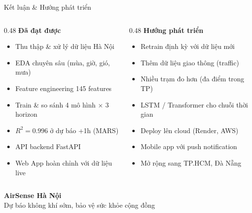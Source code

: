 \documentclass[aspectratio=169]{beamer}
\begin{document}
\begin{frame}{Kết luận \& Hướng phát triển}
  \begin{columns}[T]
    \begin{column}{0.48\textwidth}
      \textbf{Đã đạt được}
      \begin{itemize}
        \item[\checkmark] Thu thập \& xử lý dữ liệu Hà Nội
        \item[\checkmark] EDA chuyên sâu (mùa, giờ, gió, mưa)
        \item[\checkmark] Feature engineering 145 features
        \item[\checkmark] Train \& so sánh 4 mô hình $\times$ 3 horizon
        \item[\checkmark] $R^2 = 0.996$ ở dự báo +1h (MARS)
        \item[\checkmark] API backend FastAPI
        \item[\checkmark] Web App hoàn chỉnh với dữ liệu live
      \end{itemize}
    \end{column}
    \begin{column}{0.48\textwidth}
      \textbf{Hướng phát triển}
      \begin{itemize}
        \item Retrain định kỳ với dữ liệu mới
        \item Thêm dữ liệu giao thông (traffic)
        \item Nhiều trạm đo hơn (đa điểm trong TP)
        \item LSTM / Transformer cho chuỗi thời gian
        \item Deploy lên cloud (Render, AWS)
        \item Mobile app với push notification
        \item Mở rộng sang TP.HCM, Đà Nẵng
      \end{itemize}
    \end{column}
  \end{columns}
  \vspace{1em}
  \begin{center}
    \large\textbf{\color{cblue} AirSense Hà Nội}\\
    \normalsize Dự báo không khí sớm, bảo vệ sức khỏe cộng đồng
  \end{center}
\end{frame}
\end{document}

